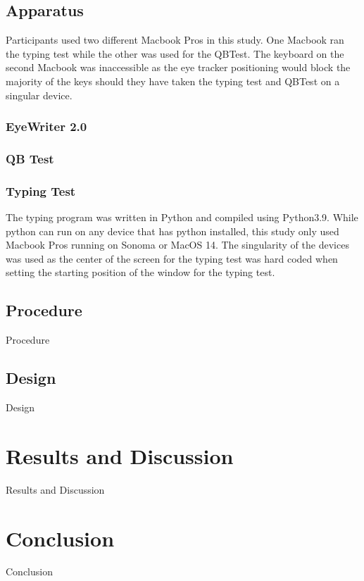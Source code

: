 \documentclass[manuscript, screen, review]{acmart} %
\begin{document}
  \subsection[short]{Apparatus}  %
  Participants used two different Macbook Pros in this study. One Macbook ran the typing test while the other was used for the QBTest. 
  The keyboard on the second Macbook was inaccessible as the eye tracker positioning would block the majority of the keys should they have 
  taken the typing test and QBTest on a singular device.

  \subsubsection{EyeWriter 2.0}
  \subsubsection{QB Test}
  \subsubsection{Typing Test}
  The typing program was written in Python and compiled using Python3.9. While python can run on any device that has python installed, this study only used Macbook Pros running on Sonoma or MacOS 14. The singularity of the devices was used as the center of the screen for the typing test was hard coded when setting the starting position of the window for the typing test. 

  \subsection[short]{Procedure}
  Procedure 

  \subsection[short]{Design}
  Design

\section{Results and Discussion}
  Results and Discussion

\section{Conclusion}
  Conclusion



\end{document}
